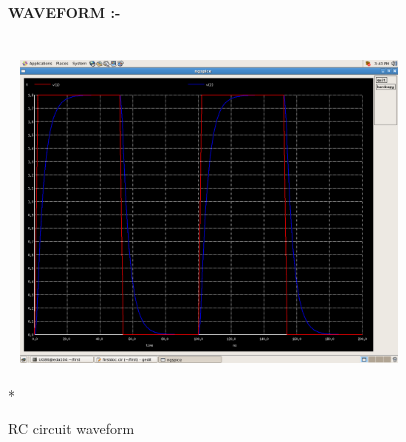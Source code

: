 \documentclass{article}
\begin{document}
\begin{flushleft}
\begin{figure}[ht] 
\large{{\bf\textcolor{rosewood}{ WAVEFORM} :-}}\vspace{5mm} \\*
\includegraphics[width=10cm, height=10cm]{rc_first.png} 
\caption{RC circuit waveform}
\label{fig:circuit1} 
\end{figure} 
\end{flushleft}
\newpage
\end{document}
